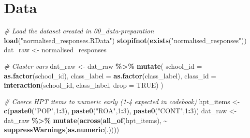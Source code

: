 \documentclass[
  10pt,
]{article}
\newenvironment{Shaded}{\begin{snugshade}}{\end{snugshade}}
\newcommand{\AttributeTok}[1]{\textcolor[rgb]{0.13,0.29,0.53}{#1}}
\newcommand{\CommentTok}[1]{\textcolor[rgb]{0.56,0.35,0.01}{\textit{#1}}}
\newcommand{\ConstantTok}[1]{\textcolor[rgb]{0.56,0.35,0.01}{#1}}
\newcommand{\DecValTok}[1]{\textcolor[rgb]{0.00,0.00,0.81}{#1}}
\newcommand{\FunctionTok}[1]{\textcolor[rgb]{0.13,0.29,0.53}{\textbf{#1}}}
\newcommand{\NormalTok}[1]{#1}
\newcommand{\OtherTok}[1]{\textcolor[rgb]{0.56,0.35,0.01}{#1}}
\newcommand{\SpecialCharTok}[1]{\textcolor[rgb]{0.81,0.36,0.00}{\textbf{#1}}}
\newcommand{\StringTok}[1]{\textcolor[rgb]{0.31,0.60,0.02}{#1}}
\begin{document}
\hypertarget{data}{%
\section{Data}\label{data}}

\begin{Shaded}
\begin{Highlighting}[]
\CommentTok{\# Load the dataset created in 00\_data{-}preparation}
\FunctionTok{load}\NormalTok{(}\StringTok{"normalised\_responses.RData"}\NormalTok{)}
\FunctionTok{stopifnot}\NormalTok{(}\FunctionTok{exists}\NormalTok{(}\StringTok{"normalised\_responses"}\NormalTok{))}
\NormalTok{dat\_raw }\OtherTok{\textless{}{-}}\NormalTok{ normalised\_responses}

\CommentTok{\# Cluster vars}
\NormalTok{dat\_raw }\OtherTok{\textless{}{-}}\NormalTok{ dat\_raw }\SpecialCharTok{\%\textgreater{}\%}
  \FunctionTok{mutate}\NormalTok{(}
    \AttributeTok{school\_id   =} \FunctionTok{as.factor}\NormalTok{(school\_id),}
    \AttributeTok{class\_label =} \FunctionTok{as.factor}\NormalTok{(class\_label),}
    \AttributeTok{class\_id    =} \FunctionTok{interaction}\NormalTok{(school\_id, class\_label, }\AttributeTok{drop =} \ConstantTok{TRUE}\NormalTok{)}
\NormalTok{  )}

\CommentTok{\# Coerce HPT items to numeric early (1{-}4 expected in codebook)}
\NormalTok{hpt\_items }\OtherTok{\textless{}{-}} \FunctionTok{c}\NormalTok{(}\FunctionTok{paste0}\NormalTok{(}\StringTok{"POP"}\NormalTok{,}\DecValTok{1}\SpecialCharTok{:}\DecValTok{3}\NormalTok{), }\FunctionTok{paste0}\NormalTok{(}\StringTok{"ROA"}\NormalTok{,}\DecValTok{1}\SpecialCharTok{:}\DecValTok{3}\NormalTok{), }\FunctionTok{paste0}\NormalTok{(}\StringTok{"CONT"}\NormalTok{,}\DecValTok{1}\SpecialCharTok{:}\DecValTok{3}\NormalTok{))}
\NormalTok{dat\_raw }\OtherTok{\textless{}{-}}\NormalTok{ dat\_raw }\SpecialCharTok{\%\textgreater{}\%} \FunctionTok{mutate}\NormalTok{(}\FunctionTok{across}\NormalTok{(}\FunctionTok{all\_of}\NormalTok{(hpt\_items), }\SpecialCharTok{\textasciitilde{}} \FunctionTok{suppressWarnings}\NormalTok{(}\FunctionTok{as.numeric}\NormalTok{(.))))}


\end{Highlighting}
\end{Shaded}
\end{document}
